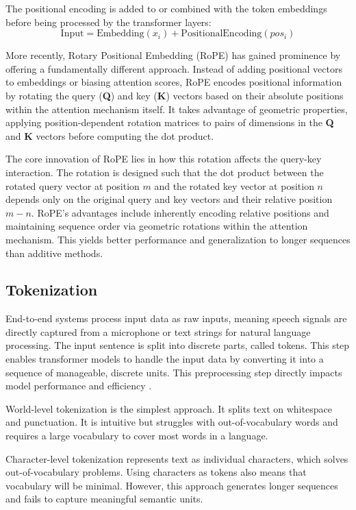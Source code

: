 The positional encoding is added to or combined with the token embeddings before being processed by the transformer layers:
\begin{equation}
\text{Input} = \text{Embedding}(x_i) + \text{PositionalEncoding}(pos_i)
\end{equation}

More recently, Rotary Positional Embedding (RoPE) \cite{su2023roformerenhancedtransformerrotary} has gained prominence by offering a fundamentally different approach. Instead of adding positional vectors to embeddings or biasing attention scores, RoPE encodes positional information by rotating the query (\textbf{Q}) and key (\textbf{K}) vectors based on their absolute positions within the attention mechanism itself. It takes advantage of geometric properties, applying position-dependent rotation matrices to pairs of dimensions in the \textbf{Q} and \textbf{K} vectors before computing the dot product.

The core innovation of RoPE lies in how this rotation affects the query-key interaction. The rotation is designed such that the dot product between the rotated query vector at position $m$ and the rotated key vector at position $n$ depends only on the original query and key vectors and their relative position $m-n$. RoPE's advantages include inherently encoding relative positions and maintaining sequence order via geometric rotations within the attention mechanism. This yields better performance and generalization to longer sequences than additive methods.


\subsection{Tokenization}
End-to-end systems process input data as raw inputs, meaning speech signals are directly captured from a microphone or text strings for natural language processing. The input sentence is split into discrete parts, called tokens. This step enables transformer models to handle the input data by converting it into a sequence of manageable, discrete units. This preprocessing step directly impacts model performance and efficiency \cite{Rust_2021}.

World-level tokenization is the simplest approach. It splits text on whitespace and punctuation. It is intuitive but struggles with out-of-vocabulary words and requires a large vocabulary to cover most words in a language.

Character-level tokenization represents text as individual characters, which solves out-of-vocabulary problems. Using characters as tokens also means that vocabulary will be minimal. However, this approach generates longer sequences and fails to capture meaningful semantic units.

